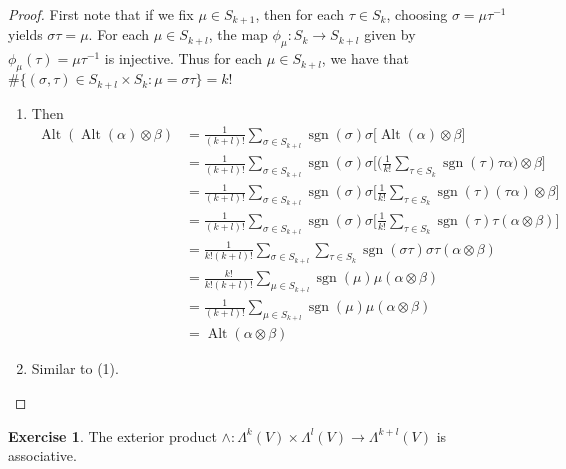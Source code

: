 \documentclass{book}
\theoremstyle{definition}
\newtheorem{ex}[definition]{Exercise}
\newcommand{\al}{\alpha}
\newcommand{\be}{\beta}
\newcommand{\sig}{\sigma}
\newcommand{\Lam}{\Lambda}
\DeclareMathOperator{\sgn}{sgn}
\DeclareMathOperator{\Alt}{Alt}
\DeclareMathOperator*{\0}{\mbf{0}}
\DeclareMathOperator*{\1}{\mbf{1}}
\begin{document}
	\begin{proof}
		First note that if we fix $\mu \in S_{k+1}$, then for each $\tau \in S_k$, choosing $\sig = \mu \tau^{-1}$ yields $\sig \tau = \mu$. For each $\mu \in S_{k+l}$, the map $\phi_{\mu}: S_{k} \rightarrow S_{k+l}$ given by $\phi_{\mu}(\tau) = \mu \tau^{-1}$ is injective. Thus for each $\mu \in S_{k+l}$, we have that $\# \{ (\sig, \tau) \in S_{k+l} \times S_{k}: \mu = \sig \tau \} = k!$ 
		\begin{enumerate}
			\item Then
			\begin{align*}
				\Alt(\Alt(\al) \otimes \be)
				&= \frac{1}{(k+l)!} \sum_{\sig \in S_{k+l}} \sgn(\sig) \sig \bigg [\Alt(\al) \otimes \be \bigg] \\
				&= \frac{1}{(k+l)!} \sum_{\sig \in S_{k+l}} \sgn(\sig) \sig \bigg[ \bigg( \frac{1}{k!}\sum_{\tau \in S_{k} } \sgn(\tau) \tau\al \bigg) \otimes \be \bigg] \\
				&= \frac{1}{(k+l)!} \sum_{\sig \in S_{k+l}} \sgn(\sig) \sig \bigg[   \frac{1}{k!} \sum_{\tau \in S_{k} } \sgn(\tau) (\tau\al)  \otimes \be \bigg] \\
				&= \frac{1}{(k+l)!} \sum_{\sig \in S_{k+l}} \sgn(\sig) \sig \bigg[  \frac{1}{k!} \sum_{\tau \in S_{k} } \sgn(\tau) \tau (\al  \otimes \be) \bigg] \\
				&=  \frac{1}{k! (k+l)!}\sum_{\sig \in S_{k+l} } \sum_{\tau \in S_{k} } \sgn(\sig \tau) \sig \tau (\al  \otimes \be) \\
				&=  \frac{k!}{k!(k+l)!} \sum_{\mu \in S_{k+l} }  \sgn(\mu) \mu (\al  \otimes \be)\\
				&=  \frac{1}{(k+l)!} \sum_{\mu \in S_{k+l} }  \sgn(\mu) \mu (\al  \otimes \be)\\
				&= \Alt(\al \otimes \be)
			\end{align*} 
		\item Similar to (1).
		\end{enumerate}
	\end{proof}

	\begin{ex}
		The exterior product $\wedge: \Lam^k(V) \times \Lam^l(V) \rightarrow \Lam^{k+l}(V)$ is associative. 
	\end{ex}
\end{document}
